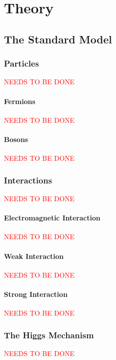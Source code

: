 \chapter{Theory}
    

\section{The Standard Model}

	\subsection{Particles}        
		\textcolor{red}{NEEDS TO BE DONE}

		\subsubsection{Fermions}
			\textcolor{red}{NEEDS TO BE DONE}

		\subsubsection{Bosons}
			\textcolor{red}{NEEDS TO BE DONE}

	\subsection{Interactions}
		\textcolor{red}{NEEDS TO BE DONE}

		\subsubsection{Electromagnetic Interaction}

			\textcolor{red}{NEEDS TO BE DONE}

		\subsubsection{Weak Interaction}
			\textcolor{red}{NEEDS TO BE DONE}

		\subsubsection{Strong Interaction}
			\textcolor{red}{NEEDS TO BE DONE}

	\subsection{The Higgs Mechanism}
		\textcolor{red}{NEEDS TO BE DONE}

